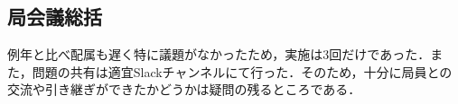 \subsection*{局会議総括}


例年と比べ配属も遅く特に議題がなかったため，実施は3回だけであった．また，問題の共有は適宜Slackチャンネルにて行った．そのため，十分に局員との交流や引き継ぎができたかどうかは疑問の残るところである．
